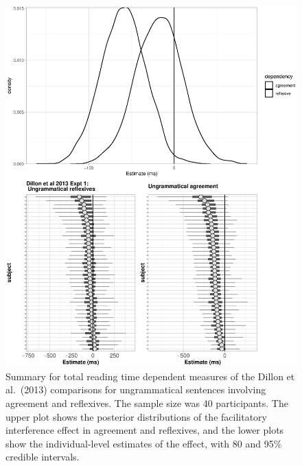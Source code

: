 \documentclass{cambridge7A}\usepackage[]{graphicx}\usepackage[]{color}
\makeatletter
\def\maxwidth{ %
  \ifdim\Gin@nat@width>\linewidth
    \linewidth
  \else
    \Gin@nat@width
  \fi
}
\newenvironment{knitrout}{}{} %
\makeatother
\begin{document}
\begin{figure}[!hbtp]
\centering
\begin{knitrout}
\color{fgcolor}

{\centering \includegraphics[width=\maxwidth]{figures/fig-unnamed-chunk-1-1} 

}



\end{knitrout}
\caption{Summary for total reading time dependent measures of the Dillon et al.\ (2013) comparisons for ungrammatical sentences involving agreement and reflexives. The sample size was 40 participants. The upper plot shows the posterior distributions of the facilitatory interference effect in agreement and reflexives, and the lower plots show the individual-level estimates of the effect, with 80 and 95\% credible intervals.}\label{fig:dillonresults}
\end{figure}
\end{document}
